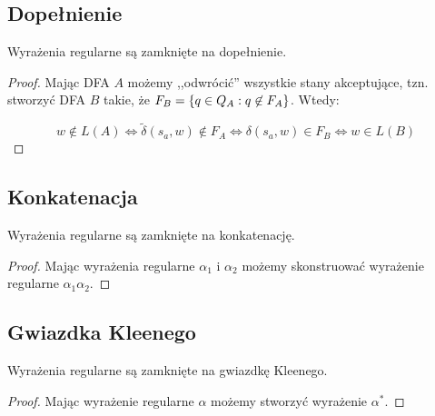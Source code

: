 \subsection{Dopełnienie}

\begin{theorem}
	Wyrażenia regularne są zamknięte na dopełnienie.
\end{theorem}
\begin{proof}
	Mając DFA \(A\) możemy ,,odwrócić'' wszystkie stany akceptujące, tzn. stworzyć DFA \(B\) takie, że \(F_B = \set{q \in Q_A : q \not \in F_A}\). Wtedy:

	\[
		w \not\in L(A) \iff \tilde \delta(s_a, w) \not \in F_A \iff \delta(s_a, w) \in F_B \iff w \in L(B)
	\]
\end{proof}

\subsection{Konkatenacja}

\begin{theorem}
	Wyrażenia regularne są zamknięte na konkatenację.
\end{theorem}

\begin{proof}
	Mając wyrażenia regularne \(\alpha_1\) i \(\alpha_2\) możemy skonstruować wyrażenie regularne \( \alpha_1 \alpha_2 \).
\end{proof}

\subsection{Gwiazdka Kleenego}

\begin{theorem}
	Wyrażenia regularne są zamknięte na gwiazdkę Kleenego.
\end{theorem}

\begin{proof}
	Mając wyrażenie regularne \(\alpha\) możemy stworzyć wyrażenie \(\alpha^*\).
\end{proof}